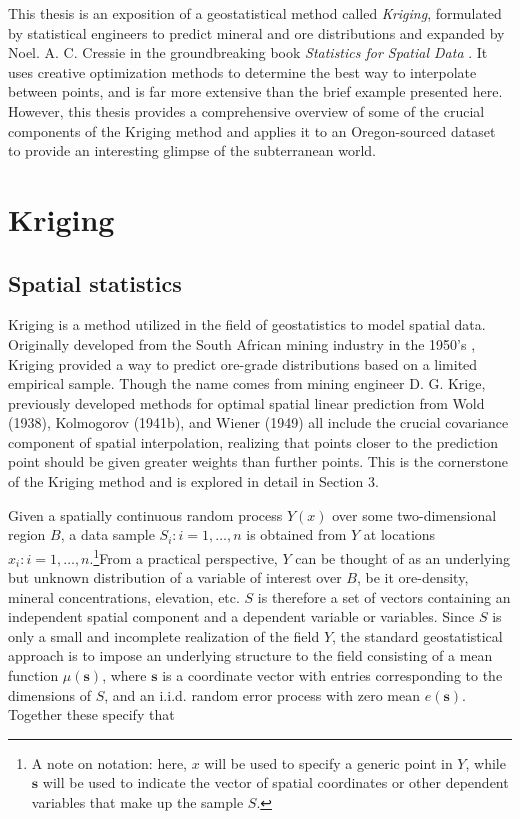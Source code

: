 \documentclass[12pt,twoside]{reedthesis}
\begin{document}
This thesis is an exposition of a geostatistical method called \emph{Kriging}, formulated by statistical engineers to predict mineral and ore distributions and expanded by Noel. A. C. Cressie in the groundbreaking book \emph{Statistics for Spatial Data} \cite{cressie:1993}. It uses creative optimization methods to determine the best way to interpolate between points, and is far more extensive than the brief example presented here. However, this thesis provides a comprehensive overview of some of the crucial components of the Kriging method and applies it to an Oregon-sourced dataset to provide an interesting glimpse of the subterranean world. 
	
	

	
	
	
    \chapter{Kriging}
    	\section{Spatial statistics}
Kriging is a method utilized in the field of geostatistics to model spatial data. Originally developed from the South African mining industry in the 1950's \cite{cressie:1993}, Kriging provided a way to predict ore-grade distributions based on a limited empirical sample. Though the name comes from mining engineer D. G. Krige, previously developed methods for optimal spatial linear prediction from Wold (1938), Kolmogorov (1941b), and Wiener (1949) all include the crucial covariance component of spatial interpolation, realizing that points closer to the prediction point should be given greater weights than further points. This is the cornerstone of the Kriging method and is explored in detail in Section 3. 

Given a spatially continuous random process $Y(x)$ over some two-dimensional region $B$, a data sample $S_i: i=1, \dots, n$ is obtained from $Y$ at locations $x_i: i=1, \dots, n$.\footnote{A note on notation: here, $x$ will be used to specify a generic point in $Y$, while $\mathbf{s}$ will be used to indicate the vector of spatial coordinates or other dependent variables that make up the sample $S$.}From a practical perspective, $Y$ can be thought of as an underlying but unknown distribution of a variable of interest over $B$, be it ore-density, mineral concentrations, elevation, etc. $S$ is therefore a set of vectors containing an independent spatial component and a dependent variable or variables. Since $S$ is only a small and incomplete realization of the field $Y$, the standard geostatistical approach is to impose an underlying structure to the field consisting of a mean function $\mu(\mathbf{s})$, where $\mathbf{s}$ is a coordinate vector with entries corresponding to the dimensions of $S$, and an i.i.d. random error process with zero mean $e(\mathbf{s})$. Together these specify that
\end{document}
